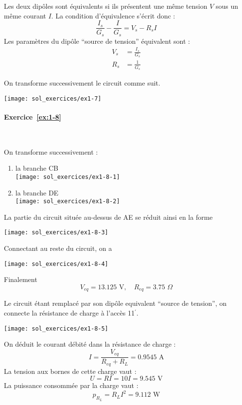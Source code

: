 Les deux dipôles sont équivalents si ils présentent une même tension $V$
sous un même courant $I$.
La condition d'équivalence s'écrit donc :
\[\frac{I_s}{G_s}-\frac{I}{G_s}=V_s-R_s I\]
Les paramètres du dipôle ``source de tension'' équivalent sont :
\begin{align*}
V_s&=\frac{I_s}{G_s}\\
R_s&=\frac{1}{G_s}
\end{align*}


On transforme successivement le circuit comme suit.
\begin{center}
	\texttt{[image: sol\_exercices/ex1-7]}
\end{center}

\paragraph{Exercice~\ref{ex:1-8}}~\\%

On transforme successivement :
\begin{enumerate}
	\item la branche CB\\
	\texttt{[image: sol\_exercices/ex1-8-1]}
	\item la branche DE\\
	\texttt{[image: sol\_exercices/ex1-8-2]}
\end{enumerate}
La partie du circuit située au-dessus de AE se réduit ainsi en la
forme
\begin{center}
	\texttt{[image: sol\_exercices/ex1-8-3]}
\end{center}
Connectant au reste du circuit, on a 
\begin{center}
	\texttt{[image: sol\_exercices/ex1-8-4]}
\end{center}

Finalement
\[V_{eq}=13.125\,\, \text{V}, \quad R_{eq}=3.75\,\, \Omega\]


Le circuit étant remplacé par son dipôle equivalent ``source de tension'',  on connecte
la résistance de charge à l'accès 11$^{'}$.\\
\begin{minipage}[c]{0.3\textwidth}
	\texttt{[image: sol\_exercices/ex1-8-5]}
\end{minipage}
\begin{minipage}[c]{0.7\textwidth}
	On déduit le courant débité dans la résistance de charge :
	\[I=\frac{V_{eq}}{R_{eq}+R_L}=0.9545\,\, \text{A}\]
	La tension aux bornes de cette charge vaut :
	\[U=RI=10I=9.545\,\, \text{V}\]
	La puissance consommée par la charge vaut :
	\[p_{R_L}=R_L I^2=9.112\,\, \text{W}\]
\end{minipage}

